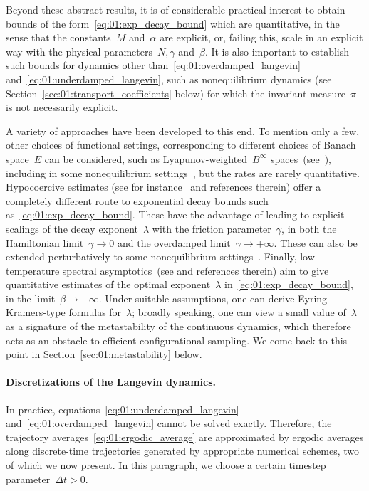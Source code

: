 Beyond these abstract results, it is of considerable practical interest to obtain bounds of the form~\eqref{eq:01:exp_decay_bound} which are quantitative, in the sense that the constants~$M$ and~$\alpha$ are explicit, or, failing this, scale in an explicit way with the physical parameters~$N,\gamma$ and~$\beta$.
It is also important to establish such bounds for dynamics other than~\eqref{eq:01:overdamped_langevin} and~\eqref{eq:01:underdamped_langevin}, such as nonequilibrium dynamics (see Section~\ref{sec:01:transport_coefficients} below) for which the invariant measure~$\pi$ is not necessarily explicit.

A variety of approaches have been developed to this end. To mention only a few, other choices of functional settings, corresponding to different choices of Banach space~$E$ can be considered, such as Lyapunov-weighted~$B^\infty$ spaces~(see~\cite[Section 8]{RB06}), including in some nonequilibrium settings~\cite{IOS19}, but the rates are rarely quantitative.
Hypocoercive estimates (see for instance~\cite{V06,DKMS13,DMS15,BFLS22} and references therein) offer a completely different route to exponential decay bounds such as~\eqref{eq:01:exp_decay_bound}. These have the advantage of leading to explicit scalings of the decay exponent~$\lambda$ with the friction parameter~$\gamma$, in both the Hamiltonian limit~$\gamma\to 0$ and the overdamped limit~$\gamma\to+\infty$.
These can also be extended perturbatively to some nonequilibrium settings~\cite[Theorems 1--3]{IOS19}.
Finally, low-temperature spectral asymptotics~(see \cite{S84,CFKS87,HKN04,BGK05,BG08,HHS08a,HHS08b,HHS11} and references therein) aim to give quantitative estimates of the optimal exponent~$\lambda$ in~\eqref{eq:01:exp_decay_bound}, in the limit~$\beta\to +\infty$.
Under suitable assumptions, one can derive Eyring--Kramers-type formulas for~$\lambda$; broadly speaking, one can view a small value of~$\lambda$  as a signature of the metastability of the continuous dynamics, which therefore acts as an obstacle to efficient configurational sampling. We come back to this point in Section~\ref{sec:01:metastability} below.


\paragraph{Discretizations of the Langevin dynamics.}
In practice, equations~\eqref{eq:01:underdamped_langevin} and~\eqref{eq:01:overdamped_langevin} cannot be solved exactly.
Therefore, the trajectory averages~\eqref{eq:01:ergodic_average} are approximated by ergodic averages along discrete-time trajectories generated by appropriate numerical schemes, two of which we now present. In this paragraph, we choose a certain timestep parameter~$\Delta t>0$.

